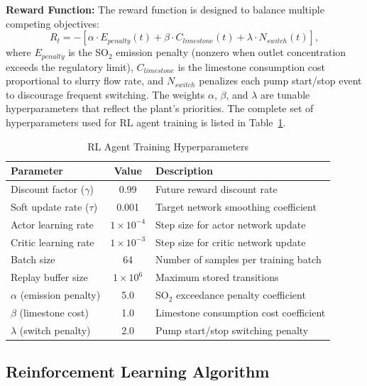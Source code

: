\documentclass[journal]{IEEEtran}
\begin{document}
\textbf{Reward Function:} The reward function is designed to balance multiple competing objectives:
\begin{equation}
R_t = -[\alpha \cdot E_{penalty}(t) + \beta \cdot C_{limestone}(t) + \lambda \cdot N_{switch}(t)],
\end{equation}
where $E_{penalty}$ is the SO$_2$ emission penalty (nonzero when outlet concentration exceeds the regulatory limit), $C_{limestone}$ is the limestone consumption cost proportional to slurry flow rate, and $N_{switch}$ penalizes each pump start/stop event to discourage frequent switching. The weights $\alpha$, $\beta$, and $\lambda$ are tunable hyperparameters that reflect the plant's priorities. The complete set of hyperparameters used for RL agent training is listed in Table~\ref{tab_hyperparams}.

\begin{table}[!t]
\centering
\caption{RL Agent Training Hyperparameters}
\label{tab_hyperparams}
\footnotesize
\begin{tabular}{|l|c|p{4.5cm}|}
\hline
\textbf{Parameter} & \textbf{Value} & \textbf{Description} \\
\hline
Discount factor ($\gamma$) & 0.99 & Future reward discount rate \\
Soft update rate ($\tau$) & 0.001 & Target network smoothing coefficient \\
Actor learning rate & $1 \times 10^{-4}$ & Step size for actor network update \\
Critic learning rate & $1 \times 10^{-3}$ & Step size for critic network update \\
Batch size & 64 & Number of samples per training batch \\
Replay buffer size & $1 \times 10^6$ & Maximum stored transitions \\
$\alpha$ (emission penalty) & 5.0 & SO$_2$ exceedance penalty coefficient \\
$\beta$ (limestone cost) & 1.0 & Limestone consumption cost coefficient \\
$\lambda$ (switch penalty) & 2.0 & Pump start/stop switching penalty \\
\hline
\end{tabular}
\end{table}

\subsection{Reinforcement Learning Algorithm}
\end{document}
